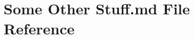 \hypertarget{_some_01_other_01_stuff_8md}{}\section{Some Other Stuff.\+md File Reference}
\label{_some_01_other_01_stuff_8md}
